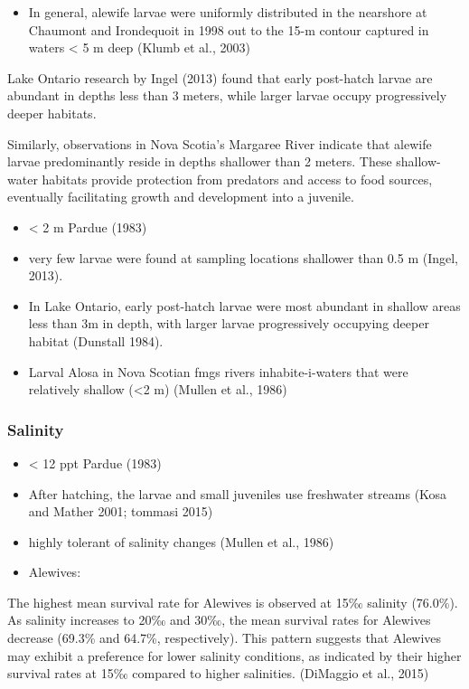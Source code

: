 \documentclass[
]{book}
\providecommand{\tightlist}{%
  \setlength{\itemsep}{0pt}\setlength{\parskip}{0pt}}
\begin{document}
\begin{itemize}
\tightlist
\item
  In general, alewife larvae were uniformly distributed in the nearshore at Chaumont and Irondequoit in 1998 out to the 15-m contour captured in waters \textless{} 5 m deep (Klumb et al., 2003)
\end{itemize}

Lake Ontario research by Ingel (2013) found that early post-hatch larvae are abundant in depths less than 3 meters, while larger larvae occupy progressively deeper habitats.

Similarly, observations in Nova Scotia's Margaree River indicate that alewife larvae predominantly reside in depths shallower than 2 meters.
These shallow-water habitats provide protection from predators and access to food sources, eventually facilitating growth and development into a juvenile.

\begin{itemize}
\item
  \textless{} 2 m Pardue (1983)
\item
  very few larvae were found at sampling locations shallower than 0.5 m (Ingel, 2013).
\item
  In Lake Ontario, early post-hatch larvae were most abundant in shallow areas less than 3m in depth, with larger larvae progressively occupying deeper habitat (Dunstall 1984).
\item
  Larval Alosa in Nova Scotian fmgs rivers inhabite-i-waters that were relatively shallow (\textless2 m) (Mullen et al., 1986)
\end{itemize}

\hypertarget{salinity-2}{%
\subsubsection{Salinity}\label{salinity-2}}

\begin{itemize}
\item
  \textless{} 12 ppt Pardue (1983)
\item
  After hatching, the larvae and small juveniles use freshwater streams (Kosa and Mather 2001; tommasi 2015)
\item
  highly tolerant of salinity changes (Mullen et al., 1986)
\item
  Alewives:
\end{itemize}

The highest mean survival rate for Alewives is observed at 15‰ salinity (76.0\%).
As salinity increases to 20‰ and 30‰, the mean survival rates for Alewives decrease (69.3\% and 64.7\%, respectively).
This pattern suggests that Alewives may exhibit a preference for lower salinity conditions, as indicated by their higher survival rates at 15‰ compared to higher salinities. (DiMaggio et al., 2015)
\end{document}
